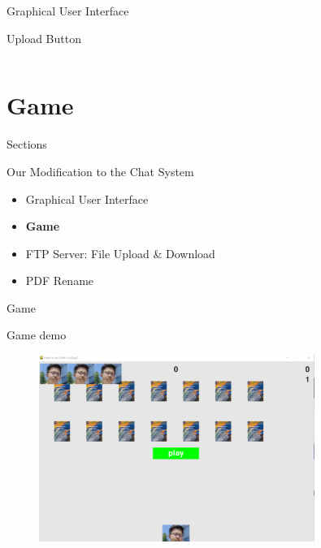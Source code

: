 \documentclass[a4paper,10pt]{beamer}
\begin{document}
\begin{frame}{Graphical User Interface}
\begin{block}{Upload Button}
\inputminted[linenos]{python}{upload.py}
\end{block}

\end{frame}

\section{Game}
\begin{frame}{Sections}
\begin{block}{Our Modification to the Chat System}
\begin{itemize}
		\item Graphical User Interface
		\item \textbf{Game}
		\item FTP Server: File Upload \& Download
		\item PDF Rename
\end{itemize}
\end{block}
\end{frame}

\begin{frame}{Game}
\begin{block}{Game demo}
\begin{figure}[H]
    \includegraphics[width=0.8\textwidth]{game3.png}
\end{figure}
\end{block}
\end{frame}
\end{document}

